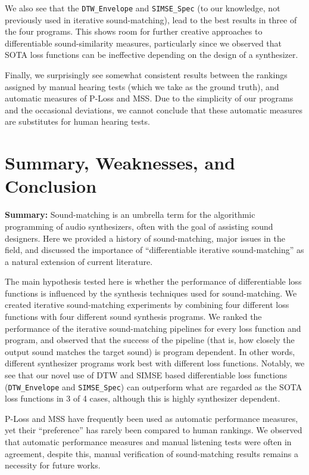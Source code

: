 \documentclass[lettersize,journal]{IEEEtran}
\newcommand{\SIMSESpec}{\texttt{SIMSE\_Spec}}
\newcommand{\DTWEnv}{\texttt{DTW\_Envelope}}
\begin{document}
We also see that the \DTWEnv{} and \SIMSESpec{} (to our knowledge, not previously used in iterative sound-matching), lead to the best results in three of the four programs. This shows room for further creative approaches to differentiable sound-similarity measures, particularly since we observed that SOTA loss functions can be ineffective depending on the design of a synthesizer. 

Finally, we surprisingly see somewhat consistent results between the rankings assigned by manual hearing tests (which we take as the ground truth), and automatic measures of P-Loss and MSS. Due to the simplicity of our programs and the occasional deviations, we cannot conclude that these automatic measures are substitutes for human hearing tests.


\section{Summary, Weaknesses, and Conclusion}
\label{sec:summary_conclusion}
\textbf{Summary:} Sound-matching is an umbrella term for the algorithmic programming of audio synthesizers, often with the goal of assisting sound designers. Here we provided a history of sound-matching, major issues in the field, and discussed the importance of ``differentiable iterative sound-matching'' as a natural extension of current literature.

The main hypothesis tested here is whether the performance of differentiable loss functions is influenced by the synthesis techniques used for sound-matching. We created iterative sound-matching experiments by combining four different loss functions with four different sound synthesis programs. We ranked the performance of the iterative sound-matching pipelines for every loss function and program, and observed that the success of the pipeline (that is, how closely the output sound matches the target sound) is program dependent. In other words, different synthesizer programs work best with different loss functions. Notably, we see that our novel use of DTW and SIMSE based differentiable loss functions (\DTWEnv{} and \SIMSESpec) can outperform what are regarded as the SOTA loss functions in 3 of 4 cases, although this is highly synthesizer dependent. 

P-Loss and MSS have frequently been used as automatic performance measures, yet their ``preference'' has rarely been compared to human rankings. We observed that automatic performance measures and manual listening tests were often in agreement, despite this, manual verification of sound-matching results remains a necessity for future works.  
\end{document}
